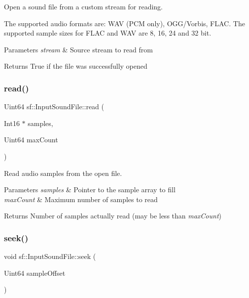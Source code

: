 Open a sound file from a custom stream for reading. 

The supported audio formats are\+: W\+AV (P\+CM only), O\+G\+G/\+Vorbis, F\+L\+AC. The supported sample sizes for F\+L\+AC and W\+AV are 8, 16, 24 and 32 bit.


\begin{DoxyParams}{Parameters}
{\em stream} & Source stream to read from\\
\hline
\end{DoxyParams}
\begin{DoxyReturn}{Returns}
True if the file was successfully opened 
\end{DoxyReturn}
\mbox{\label{classsf_1_1_input_sound_file_a83d6f64617456601edeb0daf9d14a17f}} 
\subsubsection{\texorpdfstring{read()}{read()}}
{\footnotesize\ttfamily Uint64 sf\+::\+Input\+Sound\+File\+::read (\begin{DoxyParamCaption}\item[{Int16 $\ast$}]{samples,  }\item[{Uint64}]{max\+Count }\end{DoxyParamCaption})}



Read audio samples from the open file. 


\begin{DoxyParams}{Parameters}
{\em samples} & Pointer to the sample array to fill \\
\hline
{\em max\+Count} & Maximum number of samples to read\\
\hline
\end{DoxyParams}
\begin{DoxyReturn}{Returns}
Number of samples actually read (may be less than {\itshape max\+Count}) 
\end{DoxyReturn}
\mbox{\label{classsf_1_1_input_sound_file_aaf97be15020a42e159ff88f76f22af20}} 
\subsubsection{\texorpdfstring{seek()}{seek()}\hspace{0.1cm}{\footnotesize\ttfamily [1/2]}}
{\footnotesize\ttfamily void sf\+::\+Input\+Sound\+File\+::seek (\begin{DoxyParamCaption}\item[{Uint64}]{sample\+Offset }\end{DoxyParamCaption})}



